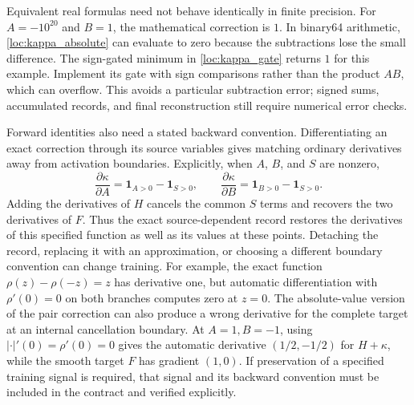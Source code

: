 Equivalent real formulas need not behave identically in finite precision.
For $A=-10^{20}$ and $B=1$, the mathematical correction is $1$. In binary64
arithmetic, \eqref{loc:kappa_absolute} can evaluate to zero because the
subtractions lose the small difference. The sign-gated minimum in
\eqref{loc:kappa_gate} returns $1$ for this example. Implement its gate with
sign comparisons rather than the product $AB$, which can overflow. This
avoids a particular subtraction error; signed sums, accumulated records,
and final reconstruction still require numerical error checks.

Forward identities also need a stated backward convention. Differentiating
an exact correction through its source variables gives matching ordinary
derivatives away from activation boundaries. Explicitly, when $A$, $B$, and
$S$ are nonzero,
\begin{equation}
 \frac{\partial\kappa}{\partial A}
 =\mathbf1_{A>0}-\mathbf1_{S>0},\qquad
 \frac{\partial\kappa}{\partial B}
 =\mathbf1_{B>0}-\mathbf1_{S>0}.
 \label{loc:gradient}
\end{equation}
Adding the derivatives of $H$ cancels the common $S$ terms and recovers the
two derivatives of $F$. Thus the exact source-dependent record restores the
derivatives of this specified function as well as its values at these
points. Detaching the record, replacing
it with an approximation, or choosing a different boundary convention can
change training. For example, the exact function
$\rho(z)-\rho(-z)=z$ has derivative one, but automatic differentiation with
$\rho'(0)=0$ on both branches computes zero at $z=0$. The absolute-value
version of the pair correction can also produce a wrong derivative for the
complete target at an internal cancellation boundary. At \(A=1,B=-1\),
using \(|\cdot|'(0)=\rho'(0)=0\) gives the automatic derivative
\((1/2,-1/2)\) for \(H+\kappa\), while the smooth target \(F\) has
gradient \((1,0)\). If preservation of a specified training signal is required,
that signal and its backward convention must be included in the contract
and verified explicitly.

